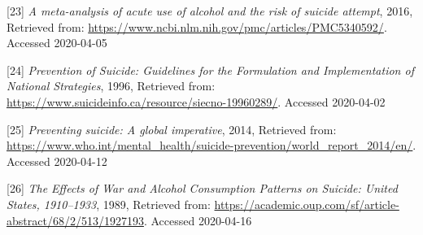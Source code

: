 \documentclass[]{article}
\begin{document}
{[}23{]} \emph{A meta-analysis of acute use of alcohol and the risk of
suicide attempt}, 2016, Retrieved from:
\url{https://www.ncbi.nlm.nih.gov/pmc/articles/PMC5340592/}. Accessed
2020-04-05

{[}24{]} \emph{Prevention of Suicide: Guidelines for the Formulation and
Implementation of National Strategies}, 1996, Retrieved from:
\url{https://www.suicideinfo.ca/resource/siecno-19960289/}. Accessed
2020-04-02

{[}25{]} \emph{Preventing suicide: A global imperative}, 2014, Retrieved
from:
\url{https://www.who.int/mental_health/suicide-prevention/world_report_2014/en/}.
Accessed 2020-04-12

{[}26{]} \emph{The Effects of War and Alcohol Consumption Patterns on
Suicide: United States, 1910--1933}, 1989, Retrieved from:
\url{https://academic.oup.com/sf/article-abstract/68/2/513/1927193}.
Accessed 2020-04-16
\end{document}
